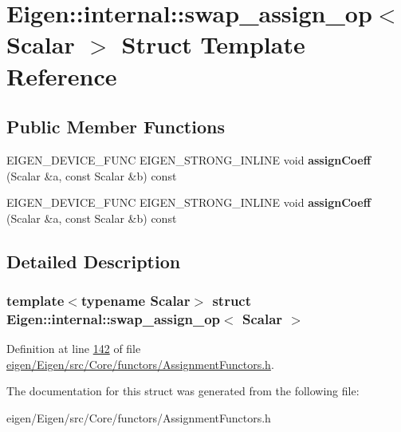 \hypertarget{struct_eigen_1_1internal_1_1swap__assign__op}{}\section{Eigen\+:\+:internal\+:\+:swap\+\_\+assign\+\_\+op$<$ Scalar $>$ Struct Template Reference}
\label{struct_eigen_1_1internal_1_1swap__assign__op}
\subsection*{Public Member Functions}
\begin{DoxyCompactItemize}
\item 
\mbox{\label{struct_eigen_1_1internal_1_1swap__assign__op_ab1fe79d889055ac656e96f7c7a51b11c}} 
E\+I\+G\+E\+N\+\_\+\+D\+E\+V\+I\+C\+E\+\_\+\+F\+U\+NC E\+I\+G\+E\+N\+\_\+\+S\+T\+R\+O\+N\+G\+\_\+\+I\+N\+L\+I\+NE void {\bfseries assign\+Coeff} (Scalar \&a, const Scalar \&b) const
\item 
\mbox{\label{struct_eigen_1_1internal_1_1swap__assign__op_ab1fe79d889055ac656e96f7c7a51b11c}} 
E\+I\+G\+E\+N\+\_\+\+D\+E\+V\+I\+C\+E\+\_\+\+F\+U\+NC E\+I\+G\+E\+N\+\_\+\+S\+T\+R\+O\+N\+G\+\_\+\+I\+N\+L\+I\+NE void {\bfseries assign\+Coeff} (Scalar \&a, const Scalar \&b) const
\end{DoxyCompactItemize}


\subsection{Detailed Description}
\subsubsection*{template$<$typename Scalar$>$\newline
struct Eigen\+::internal\+::swap\+\_\+assign\+\_\+op$<$ Scalar $>$}



Definition at line \hyperlink{eigen_2_eigen_2src_2_core_2functors_2_assignment_functors_8h_source_l00142}{142} of file \hyperlink{eigen_2_eigen_2src_2_core_2functors_2_assignment_functors_8h_source}{eigen/\+Eigen/src/\+Core/functors/\+Assignment\+Functors.\+h}.



The documentation for this struct was generated from the following file\+:\begin{DoxyCompactItemize}
\item 
eigen/\+Eigen/src/\+Core/functors/\+Assignment\+Functors.\+h\end{DoxyCompactItemize}
